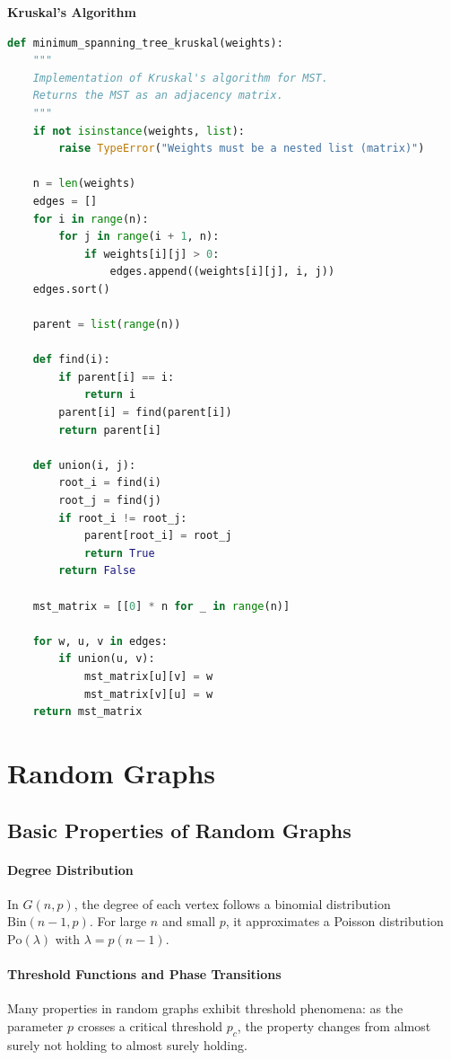 \documentclass[oneside]{book}
\begin{document}
\textbf{Kruskal's Algorithm}
\begin{lstlisting}[language=Python]
def minimum_spanning_tree_kruskal(weights):
    """
    Implementation of Kruskal's algorithm for MST.
    Returns the MST as an adjacency matrix.
    """
    if not isinstance(weights, list):
        raise TypeError("Weights must be a nested list (matrix)")

    n = len(weights)
    edges = []
    for i in range(n):
        for j in range(i + 1, n):
            if weights[i][j] > 0:
                edges.append((weights[i][j], i, j))
    edges.sort()
    
    parent = list(range(n))
    
    def find(i):
        if parent[i] == i:
            return i
        parent[i] = find(parent[i])
        return parent[i]
        
    def union(i, j):
        root_i = find(i)
        root_j = find(j)
        if root_i != root_j:
            parent[root_i] = root_j
            return True
        return False
        
    mst_matrix = [[0] * n for _ in range(n)]
    
    for w, u, v in edges:
        if union(u, v):
            mst_matrix[u][v] = w
            mst_matrix[v][u] = w
    return mst_matrix
\end{lstlisting}



\section{Random Graphs}

\subsection{Basic Properties of Random Graphs}

\paragraph{Degree Distribution}
\begin{theorem}
In $G(n,p)$, the degree of each vertex follows a binomial distribution $\text{Bin}(n-1, p)$. For large $n$ and small $p$, it approximates a Poisson distribution $\text{Po}(\lambda)$ with $\lambda = p(n-1)$.
\end{theorem}

\paragraph{Threshold Functions and Phase Transitions}
Many properties in random graphs exhibit threshold phenomena: as the parameter $p$ crosses a critical threshold $p_c$, the property changes from almost surely not holding to almost surely holding.
\end{document}
